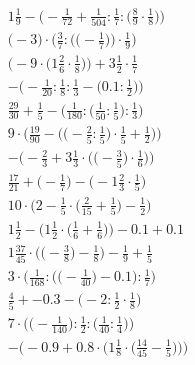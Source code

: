 \documentclass[8pt]{article}
\begin{document}
\begin{align}
1\frac{1}{9} - \Big(-\frac{1}{72} + \frac{1}{504} : \frac{1}{7} : \big(\frac{8}{9} \cdot \frac{1}{8}\big)\Big) \\
\bigg(-3\bigg) \cdot \bigg(\frac{3}{7} : \Big(\big(-\frac{1}{7}\big)\Big) \cdot \frac{1}{9}\bigg) \\
\Big(-9 \cdot \big(1\frac{2}{6} \cdot \frac{1}{8}\big)\Big) + 3\frac{1}{2} \cdot \frac{1}{7} \\
-\Big(-\frac{1}{20} : \frac{1}{8} : \frac{1}{3} - \big(0.1 : \frac{1}{2}\big)\Big) \\
\frac{29}{30} + \frac{1}{5} - \Big(\frac{1}{180} : \big(\frac{1}{50} : \frac{1}{5}\big) : \frac{1}{3}\Big) \\
9 \cdot \bigg(\frac{19}{90} - \Big(\big(-\frac{2}{5} : \frac{1}{5}\big) \cdot \frac{1}{5} + \frac{1}{2}\Big)\bigg) \\
-\bigg(-\frac{2}{3} + 3\frac{1}{3} \cdot \Big(\big(-\frac{3}{5}\big) \cdot \frac{1}{6}\Big)\bigg) \\
\frac{17}{21} + \big(-\frac{1}{7}\big) - \big(-1\frac{2}{3} \cdot \frac{1}{5}\big) \\
10 \cdot \Big(2 - \frac{1}{5} \cdot \big(\frac{2}{15} + \frac{1}{5}\big) - \frac{1}{2}\Big) \\
1\frac{1}{2} - \Big(1\frac{1}{2} \cdot \big(\frac{1}{6} + \frac{1}{6}\big)\Big) - 0.1 + 0.1 \\
1\frac{37}{45} \cdot \Big(\big(-\frac{3}{8}\big) - \frac{1}{8}\Big) - \frac{1}{9} + \frac{1}{5} \\
3 \cdot \bigg(\frac{1}{168} : \Big(\big(-\frac{1}{40}\big) - 0.1\Big) : \frac{1}{7}\bigg) \\
\frac{4}{5} + -0.3 - \big(-2 : \frac{1}{2} \cdot \frac{1}{8}\big) \\
7 \cdot \Big(\big(-\frac{1}{140}\big) : \frac{1}{2} : \big(\frac{1}{40} : \frac{1}{4}\big)\Big) \\
-\bigg(-0.9 + 0.8 \cdot \Big(1\frac{1}{8} \cdot \big(\frac{14}{45} - \frac{1}{5}\big)\Big)\bigg)
\end{align}
\end{document}
